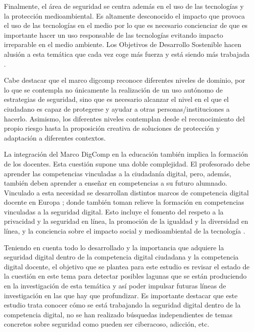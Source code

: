 \documentclass[spanish]{textolivre}
\begin{document}
Finalmente, el área de seguridad se centra además en el uso de las tecnologías y la protección medioambiental. Es altamente desconocido el impacto que provoca el uso de las tecnologías en el medio por lo que es necesario concienciar de que es importante hacer un uso responsable de las tecnologías evitando impacto irreparable en el medio ambiente. Los Objetivos de Desarrollo Sostenible hacen alusión a esta temática que cada vez coge más fuerza y está siendo más trabajada \cite{barragan2020teaching,tucho2020impacto,silva2023nivel}.

Cabe destacar que el marco digcomp reconoce diferentes niveles de dominio, por lo que se contempla no únicamente la realización de un uso autónomo de estrategias de seguridad, sino que es necesario alcanzar el nivel en el que el ciudadano es capaz de protegerse y ayudar a otras personas/instituciones a hacerlo. Asimismo, los diferentes niveles contemplan desde el reconocimiento del propio riesgo hasta la proposición creativa de soluciones de protección y adaptación a diferentes contextos.

La integración del Marco DigComp en la educación también implica la formación de los docentes. Esta cuestión supone una doble complejidad. El profesorado debe aprender las competencias vinculadas a la ciudadanía digital, pero, además, también deben aprender a enseñar en competencias a su futuro alumnado. Vinculado a esta necesidad se desarrollan distintos marcos de competencia digital docente en Europa \cite{redecker2017european,intef2017marco}; donde también toman relieve la formación en competencias vinculadas a la seguridad digital. Esto incluye el fomento del respeto a la privacidad y la seguridad en línea, la promoción de la igualdad y la diversidad en línea, y la conciencia sobre el impacto social y medioambiental de la tecnología \cite{rodriguez2023evaluacion}.

Teniendo en cuenta todo lo desarrollado y la importancia que adquiere la seguridad digital dentro de la competencia digital ciudadana y la competencia digital docente, el objetivo que se plantea para este estudio es revisar el estado de la cuestión en este tema para detectar posibles lagunas que se están produciendo en la investigación de esta temática y así poder impulsar futuras líneas de investigación en las que hay que profundizar. Es importante destacar que este estudio trata conocer cómo se está trabajando la seguridad digital dentro de la competencia digital, no se han realizado búsquedas independientes de temas concretos sobre seguridad como pueden ser ciberacoso, adicción, etc.
\end{document}
